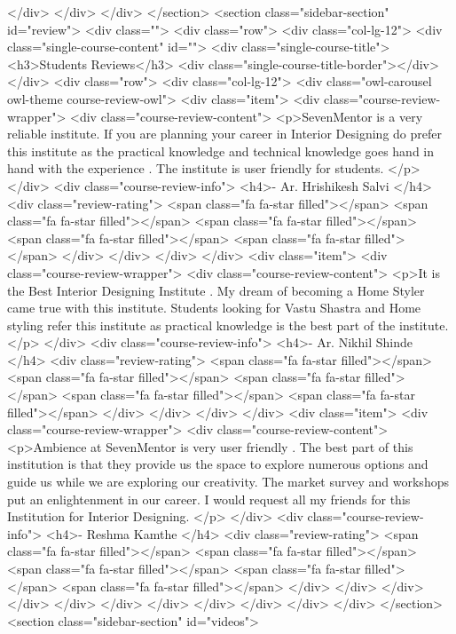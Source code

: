 {</div>
</div>
</div>
</section>
<section class="sidebar-section" id="review">
<div class="">
<div class="row">
<div class="col-lg-12">
<div class="single-course-content" id="">
<div class="single-course-title">
<h3>Students Reviews</h3>
<div class="single-course-title-border"></div>
</div>
<div class="row">
<div class="col-lg-12">
<div class="owl-carousel owl-theme course-review-owl">
<div class="item">
<div class="course-review-wrapper">
<div class="course-review-content">
<p>SevenMentor is a very reliable institute. If you are planning your career in Interior Designing do prefer this institute as the practical knowledge and technical knowledge goes hand in hand with the experience . The institute is user friendly for students.
</p>
</div>
<div class="course-review-info">
<h4>- Ar. Hrishikesh Salvi </h4>
<div class="review-rating">
<span class="fa fa-star filled"></span>
<span class="fa fa-star filled"></span>
<span class="fa fa-star filled"></span>
<span class="fa fa-star filled"></span>
<span class="fa fa-star filled"></span>
</div>
</div>
</div>
</div>
<div class="item">
<div class="course-review-wrapper">
<div class="course-review-content">
<p>It is the Best Interior Designing Institute . My dream of becoming a Home Styler came true with this institute. Students looking for Vastu Shastra and Home styling refer this institute as practical knowledge is the best part of the institute.
</p>
</div>
<div class="course-review-info">
<h4>- Ar. Nikhil Shinde </h4>
<div class="review-rating">
<span class="fa fa-star filled"></span>
<span class="fa fa-star filled"></span>
<span class="fa fa-star filled"></span>
<span class="fa fa-star filled"></span>
<span class="fa fa-star filled"></span>
</div>
</div>
</div>
</div>
<div class="item">
<div class="course-review-wrapper">
<div class="course-review-content">
<p>Ambience at SevenMentor is very user friendly . The best part of this institution is that they provide us the space to explore numerous options and guide us while we are exploring our creativity. The market survey and workshops put an enlightenment in our career. I would request all my friends for this Institution for Interior Designing.
</p>
</div>
<div class="course-review-info">
<h4>- Reshma Kamthe </h4>
<div class="review-rating">
<span class="fa fa-star filled"></span>
<span class="fa fa-star filled"></span>
<span class="fa fa-star filled"></span>
<span class="fa fa-star filled"></span>
<span class="fa fa-star filled"></span>
</div>
</div>
</div>
</div>
</div>
</div>
</div>
</div>
</div>
</div>
</div>
</section>
<section class="sidebar-section" id="videos">
}
